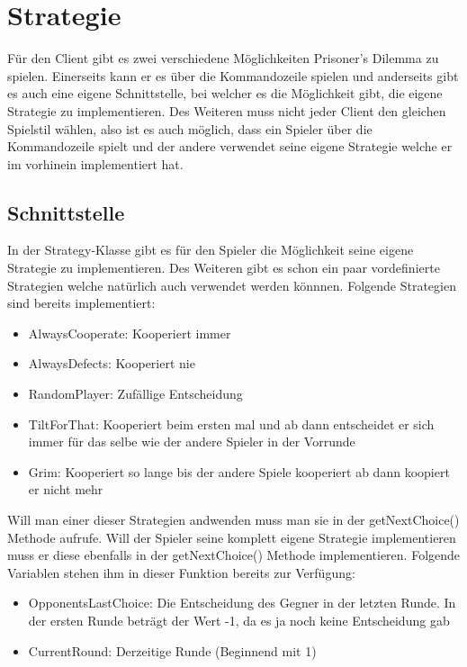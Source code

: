 \documentclass[12pt, letterpaper]{article}
\begin{document}
\newpage

\section{Strategie}
Für den Client gibt es zwei verschiedene Möglichkeiten Prisoner's Dilemma zu spielen. Einerseits kann er es über die Kommandozeile spielen und anderseits gibt es auch eine eigene Schnittstelle, bei welcher es die Möglichkeit gibt, die eigene Strategie zu implementieren. Des Weiteren muss nicht jeder Client den gleichen Spielstil wählen, also ist es auch möglich, dass ein Spieler über die Kommandozeile spielt und der andere verwendet seine eigene Strategie welche er im vorhinein implementiert hat.

\subsection{Schnittstelle}
In der Strategy-Klasse gibt es für den Spieler die Möglichkeit seine eigene Strategie zu implementieren. Des Weiteren gibt es schon ein paar vordefinierte Strategien welche natürlich auch verwendet werden könnnen. Folgende Strategien sind bereits implementiert:

\begin{itemize}
	\item AlwaysCooperate: Kooperiert immer
	\item AlwaysDefects: Kooperiert nie
	\item RandomPlayer: Zufällige Entscheidung
	\item TiltForThat: Kooperiert beim ersten mal und ab dann entscheidet er sich immer für das selbe wie der andere Spieler in der Vorrunde
	\item Grim: Kooperiert so lange bis der andere Spiele kooperiert ab dann koopiert er nicht mehr
\end{itemize}

\noindent
Will man einer dieser Strategien andwenden muss man sie in der getNextChoice() Methode aufrufe. Will der Spieler seine komplett eigene Strategie implementieren muss er diese ebenfalls in der getNextChoice() Methode implementieren. Folgende Variablen stehen ihm in dieser Funktion bereits zur Verfügung:

\begin{itemize}
	\item OpponentsLastChoice: Die Entscheidung des Gegner in der letzten Runde. In der ersten Runde beträgt der Wert -1, da es ja noch keine Entscheidung gab
	\item CurrentRound: Derzeitige Runde (Beginnend mit 1)
\end{itemize}
\end{document}
